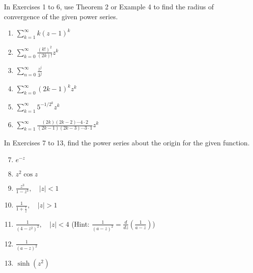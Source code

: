 \documentclass[12pt]{article}
\theoremstyle{definition} %
\theoremstyle{plain} %
\begin{document}
In Exercises 1 to 6, use Theorem 2 or Example 4 to find the radius of convergence of the given power series.
\begin{enumerate}
    \item $\sum_{k=1}^\infty k(z - 1)^k$
    \item $\sum_{k=0}^\infty \frac{(k!)^2}{(2k)!} z^k$
    \item $\sum_{n=0}^\infty \frac{z^j}{3^j}$
    \item $\sum_{k=0}^\infty (2k - 1)^k z^k$
    \item $\sum_{k=1}^\infty 5^{-1/2^k} z^k$
    \item $\sum_{k=1}^\infty \frac{(2k)(2k - 2) \cdots 4 \cdot 2}{(2k - 1)(2k - 3) \cdots 3 \cdot 1} z^k$
\end{enumerate}

In Exercises 7 to 13, find the power series about the origin for the given function.
\begin{enumerate}
    \setcounter{enumi}{6}
    \item $e^{-z}$
    \item $z^2 \cos z$
    \item $\frac{z^3}{1 - z^3}, \quad |z| < 1$
    \item $\frac{1}{1 + \frac{1}{z}}, \quad |z| > 1$
    \item $\frac{1}{(4 - z^2)^2}, \quad |z| < 4$ \hfill (Hint: $\frac{1}{(a - z)^2} = \frac{d}{dz} \left( \frac{1}{a - z} \right)$)
    \item $\frac{1}{(a - z)^2}$
    \item $\sinh(z^2)$
\end{enumerate}
\end{document}
